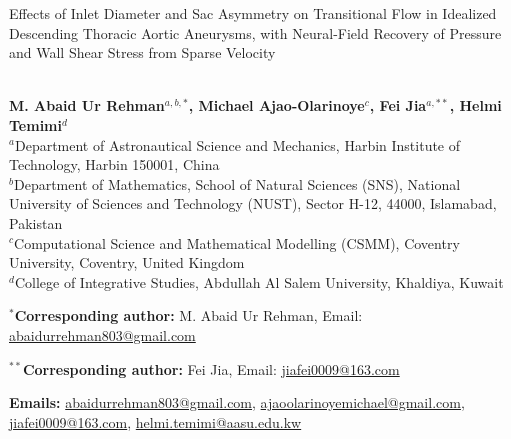 \documentclass[12pt,a4paper]{article}
\title{\textbf{}}
\theoremstyle{definition}
\numberwithin{equation}{section}
\newif\ifanonymized
\begin{document}
\begin{center}

{\Large \bf

Effects of Inlet Diameter and Sac Asymmetry on Transitional Flow in Idealized Descending Thoracic Aortic Aneurysms, with Neural-Field Recovery of Pressure and Wall Shear Stress from Sparse Velocity
}\\[12mm]


\ifanonymized\else
{\bf
M. Abaid Ur Rehman$^{a,b,*}$,
{Michael Ajao-Olarinoye$^{c}$},
Fei Jia$^{a,**}$,
Helmi Temimi$^{d}$
}\\[3mm]

{$^{a}$Department of Astronautical Science and Mechanics,
Harbin Institute of Technology, Harbin 150001, China}\\

{$^{b}$Department of Mathematics, School of Natural Sciences (SNS),
National University of Sciences and Technology (NUST),
Sector H-12, 44000, Islamabad, Pakistan}\\

{
$^{c}$Computational Science and Mathematical Modelling (CSMM),
Coventry University, Coventry, United Kingdom
}\\

{$^{d}$College of Integrative Studies,
Abdullah Al Salem University, Khaldiya, Kuwait}\\[3mm]
\fi

\end{center}

\ifanonymized\else
\noindent
$^{*}$\textbf{Corresponding author:}
M. Abaid Ur Rehman,
Email:
\href{mailto:abaidurrehman803@gmail.com}
{abaidurrehman803@gmail.com}

\vspace{1mm}

\noindent
$^{**}$\textbf{Corresponding author:}
Fei Jia,
Email:
\href{mailto:jiafei0009@163.com}
{jiafei0009@163.com}

\vspace{3mm}

\begin{center}
\textbf{Emails:}
\href{mailto:abaidurrehman803@gmail.com}
{abaidurrehman803@gmail.com},
{
\href{mailto:ajaoolarinoyemichael@gmail.com}
{ajaoolarinoyemichael@gmail.com}},
\href{mailto:jiafei0009@163.com}
{jiafei0009@163.com},
\href{mailto:helmi.temimi@aasu.edu.kw}
{helmi.temimi@aasu.edu.kw}
\end{center}
\fi
\end{document}

